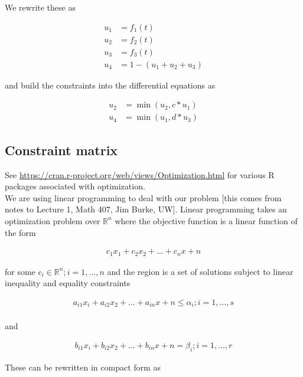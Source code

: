 \documentclass[12pt, oneside]{article}   	%
\begin{document}
\noindent We rewrite these as 

\begin{align}
 u_1 & = f_1(t) \label{eq:10} \\
 u_2 & = f_2(t) \label{eq:11} \\
 u_3 & = f_3(t) \label{eq:12} \\
 u_4 & = 1-(u_1+u_2+u_3) \label{eq:13} 
\end{align}

\noindent and build the constraints into the differential equations as 

\begin{align} 
u_2 & = \min(u_2, c*u_1) \label{eq:14}  \\
u_4 & = \min(u_1, d*u_3) \label{eq:15} 
 \end{align}

\subsection*{Constraint matrix}

\noindent See \url{https://cran.r-project.org/web/views/Optimization.html} for various R packages associated with optimization. \\ 

\noindent We are using linear programming to deal with our problem [this comes from notes to Lecture 1, Math 407, Jim Burke, UW]. Linear programming takes an optimization problem over $\mathbb{R}^n$ where the objective function is a linear function of the form 

\begin{align}
c_1 x_1 + c_2 x_2 + \dots + c_n x+n 
\end{align}

\noindent for some $c_i \in \mathbb{R}^n; i = 1,\dots,n $ and the region is a set of solutions subject to linear inequality and equality constraints

\begin{align}
a_{i1} x_i + a_{i2} x_2 + \dots + a_{in} x+n \leq \alpha_i ;  i = 1,\dots,s \\
\end{align}

\noindent and

\begin{align}
b_{i1} x_i + b_{i2} x_2 + \dots + b_{in} x+n = \beta_i ;  i = 1,\dots,r
\end{align}

\noindent These can be rewritten in compact form as
\end{document}
